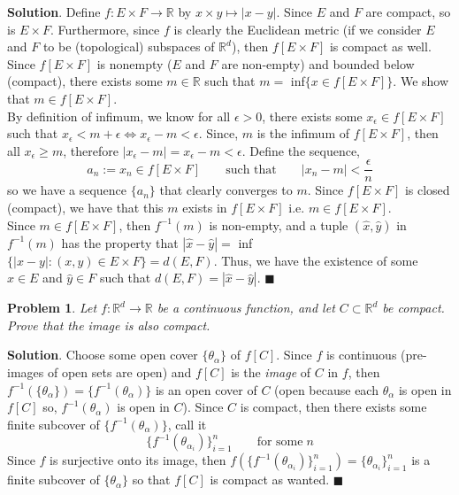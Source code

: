 \documentclass[12pt]{article}
\renewcommand{\=}[1]{\stackrel{#1}{=}} %
\newtheorem{p}{Problem}[section]
\theoremstyle{definition}
\newenvironment{s}{%
        \begin{trivlist} \item \textbf{Solution}. }{%
            \hspace*{\fill} $\blacksquare$\end{trivlist}}%
\begin{document}
\begin{s}
    Define $f: E\times F \to \mathbb{R}$ by $x \times y \mapsto |x-y|$. Since $E$ and $F$ are compact, so is $E\times F$.
    Furthermore, since $f$ is clearly the Euclidean metric (if we consider $E$ and $F$ to be (topological) subspaces of $\mathbb{R}^d$),
    then $f[E\times F]$ is compact as well. Since $f[E\times F]$ is nonempty ($E$ and $F$ are non-empty) and bounded below (compact),
    there exists some $m\in\mathbb{R}$ such that $m =$ inf$\{x\in f[E\times F]\}$. We show that $m\in f[E\times F]$.\\

    By definition of infimum, we know for all $\epsilon>0$, there exists some $x_{\epsilon}\in f[E\times F]$ such that
    $x_{\epsilon} < m + \epsilon \iff x_{\epsilon} - m < \epsilon$. Since, $m$ is the infimum of $f[E\times F]$, then all
    $x_{\epsilon}\geq m$, therefore $|x_{\epsilon} - m| = x_{\epsilon} - m < \epsilon$. Define the sequence,
    \[ a_n := x_n\in f[E\times F] \qquad\text{such that}\qquad |x_n - m| < \frac{\epsilon}{n} \]
    so we have a sequence $\{a_n\}$ that clearly converges to $m$. Since $f[E\times F]$ is closed (compact), we have that
    this $m$ exists in $f[E\times F]$ i.e. $m\in f[E\times F]$.\\

    Since $m\in f[E\times F]$, then $f^{-1}(m)$ is non-empty, and a tuple $(\hat{x},\hat{y})$ in $f^{-1}(m)$ has the property that
    $|\hat{x}-\hat{y}| =$ inf$\{|x-y|: (x,y)\in E\times F\} = d(E,F)$. 
    Thus, we have the existence of some $\hat{x}\in E$ and $\hat{y}\in F$ such that $d(E,F) = |\hat{x}-\hat{y}|$.
\end{s}

\begin{p}
    Let $f:\mathbb{R}^d\to\mathbb{R}$ be a continuous function, and let $C\subset\mathbb{R}^d$ be compact. Prove that the image
    is also compact.
\end{p}

\begin{s}
    Choose some open cover $\{\theta_{\alpha}\}$ of $f[C]$. Since $f$ is continuous (pre-images of open sets are open) 
    and $f[C]$ is the \textit{image} of $C$ in $f$, then $f^{-1}(\{\theta_{\alpha}\}) = \{f^{-1}(\theta_{\alpha})\}$ is an 
    open cover of $C$ (open because each $\theta_{\alpha}$ is open in $f[C]$ so, $f^{-1}(\theta_{\alpha})$ is open in $C$).
    Since $C$ is compact, then there exists some finite subcover of $\{f^{-1}(\theta_{\alpha})\}$, call it
    \[ \{f^{-1}(\theta_{\alpha_i})\}_{i=1}^n \qquad\text{for some}\;n \]
    Since $f$ is surjective onto its image, then $f(\{f^{-1}(\theta_{\alpha_i})\}_{i=1}^n) = \{\theta_{\alpha_i}\}_{i=1}^n$
    is a finite subcover of $\{\theta_{\alpha}\}$ so that $f[C]$ is compact as wanted.
\end{s}
\end{document}
